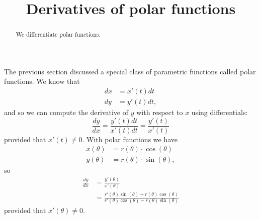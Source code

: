 \documentclass{ximera}
\title[Dig-In:]{Derivatives of polar functions}
\begin{document}
\begin{abstract}
  We differentiate polar functions.
\end{abstract}
\maketitle

The previous section discussed a special class of parametric functions
called polar functions.  We know that
\begin{align*}
  dx &= x'(t) dt\\
  dy &= y'(t) dt,
\end{align*}
and so we can compute the derivative of $y$ with respect to $x$ using
differentials:
\[
\frac{dy}{dx} = \frac{y'(t) dt}{x'(t) dt} = \frac{y'(t)}{x'(t)}
\]
provided that $x'(t) \ne 0$.  With polar functions we have
\begin{align*}
  x(\theta) &= r(\theta) \cdot \cos(\theta) \\
  y(\theta) &= r(\theta) \cdot \sin(\theta),
\end{align*}
so
\begin{align*}
\frac{dy}{dx} &= \frac{y'(\theta)}{x'(\theta)} \\
&= \frac{r'(\theta) \sin(\theta)+r(\theta) \cos(\theta)}{r'(\theta)\cos(\theta)-r(\theta)\sin(\theta)}
\end{align*}
provided that $x'(\theta)\ne 0$.
\end{document}
